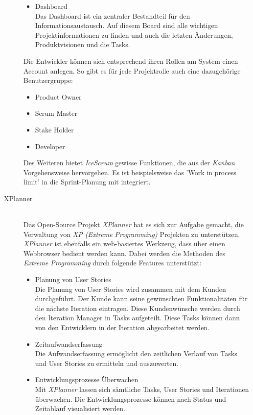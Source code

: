 \begin{description}
\begin{itemize}
\item Dashboard\\
Das Dashboard ist ein zentraler Bestandteil für den Informationsaustausch. Auf diesem Board sind alle wichtigen Projektinformationen zu finden und auch die letzten Änderungen, Produktvisionen und die Tasks. 
\end{itemize}

Die Entwickler können sich entsprechend ihren Rollen am System einen Account anlegen. So gibt es für jede Projektrolle auch eine dazugehörige Benutzergruppe:
\begin{itemize}
\item Product Owner
\item Scrum Master
\item Stake Holder
\item Developer
\end{itemize}

Des Weiteren bietet \emph{IceScrum} gewisse Funktionen, die aus der \emph{Kanban} Vorgehensweise hervorgehen. Es ist beispielsweise das 'Work in process limit' in die Sprint-Planung mit integriert. \cite{bib:icescrum} \\


\item[XPlanner]\hspace*{1em}\\
Das Open-Source Projekt \emph{XPlanner} hat es sich zur Aufgabe gemacht, die Verwaltung von \emph{XP (Extreme Programming)} Projekten zu unterstützen. \emph{XPlanner} ist ebenfalls ein web-basiertes Werkzeug, dass über einen Webbrowser bedient werden kann. Dabei werden die Methoden des \emph{Extreme Programming} durch folgende Features unterstützt:
\begin{itemize}
\item Planung von User Stories\\
Die Planung von User Stories wird zusammen mit dem Kunden durchgeführt. Der Kunde kann seine gewünschten Funktionalitäten für die nächste Iteration eintragen. Diese Kundenwünsche werden durch den Iteration Manager in Tasks aufgeteilt. Diese Tasks können dann von den Entwicklern in der Iteration abgearbeitet werden.

\item Zeitaufwandserfassung\\
Die Aufwandserfassung ermöglicht den zeitlichen Verlauf von Tasks und User Stories zu ermitteln und auszuwerten. 

\item Entwicklungsprozesse Überwachen\\
Mit \emph{XPlanner} lassen sich sämtliche Tasks, User Stories und Iterationen überwachen. Die Entwicklungsprozesse können nach Status und Zeitablauf visualisiert werden.


\end{itemize}
\end{description}
